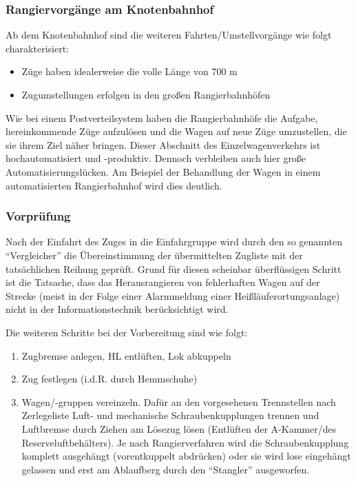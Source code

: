 \subsubsection{Rangiervorgänge am Knotenbahnhof}
Ab dem Knotenbahnhof sind die weiteren Fahrten/Umstellvorgänge wie folgt charakterisiert:
\begin{itemize}
    \item Züge haben idealerweise die volle Länge von 700 m
    \item Zugumstellungen erfolgen in den großen Rangierbahnhöfen
\end{itemize}
Wie bei einem Postverteilsystem haben die Rangierbahnhöfe die Aufgabe, hereinkommende Züge aufzulösen und die Wagen auf neue Züge umzustellen, die sie ihrem Ziel näher bringen. Dieser Abschnitt des Einzelwagenverkehrs ist hochautomatisiert und -produktiv. Dennoch verbleiben auch hier große Automatisierungslücken. Am Beispiel der Behandlung der Wagen in einem automatisierten Rangierbahnhof wird dies deutlich.
\subsubsection{Vorprüfung}
Nach der Einfahrt des Zuges in die Einfahrgruppe wird durch den so genannten "`Vergleicher"' die Übereinstimmung der übermittelten Zugliste mit der tatsächlichen Reihung geprüft. Grund für diesen scheinbar überflüssigen Schritt ist die Tatsache, dass das Herausrangieren von fehlerhaften Wagen auf der Strecke (meist in der Folge einer Alarmmeldung einer Heißläuferortungsanlage) nicht in der Informationstechnik berücksichtigt wird.\par
Die weiteren Schritte bei der Vorbereitung sind wie folgt:
\begin{enumerate}
    \item Zugbremse anlegen, HL entlüften, Lok abkuppeln
    \item Zug festlegen (i.d.R. durch Hemmschuhe)
    \item Wagen/-gruppen vereinzeln. Dafür an den vorgesehenen Trennstellen nach Zerlegeliste Luft- und mechanische Schraubenkupplungen trennen und Luftbremse durch Ziehen am Lösezug lösen (Entlüften der A-Kammer/des Reserveluftbehälters). Je nach Rangierverfahren wird die Schraubenkupplung komplett ausgehängt (vorentkuppelt abdrücken) oder sie wird lose eingehängt gelassen und erst am Ablaufberg durch den "`Stangler"' ausgeworfen.
\end{enumerate}
